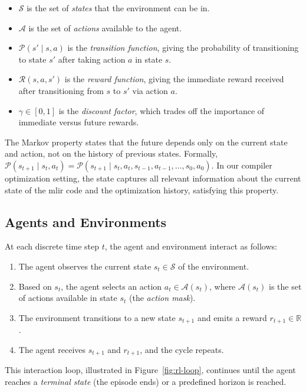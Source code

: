 \begin{itemize}
    \item $\mathcal{S}$ is the set of \textit{states} that the environment can be in.
    \item $\mathcal{A}$ is the set of \textit{actions} available to the agent.
    \item $\mathcal{P}(s' \mid s, a)$ is the \textit{transition function}, giving the probability of transitioning to state $s'$ after taking action $a$ in state $s$.
    \item $\mathcal{R}(s, a, s')$ is the \textit{reward function}, giving the immediate reward received after transitioning from $s$ to $s'$ via action $a$.
    \item $\gamma \in [0, 1]$ is the \textit{discount factor}, which trades off the importance of immediate versus future rewards.
\end{itemize}

The Markov property states that the future depends only on the current state and action, not on the history of previous states. Formally, $\mathcal{P}(s_{t+1} \mid s_t, a_t) = \mathcal{P}(s_{t+1} \mid s_t, a_t, s_{t-1}, a_{t-1}, \ldots, s_0, a_0)$. In our compiler optimization setting, the state captures all relevant information about the current state of the \gls{mlir} code and the optimization history, satisfying this property.

\subsection{Agents and Environments}

At each discrete time step $t$, the agent and environment interact as follows:

\begin{enumerate}
    \item The agent observes the current state $s_t \in \mathcal{S}$ of the environment.
    \item Based on $s_t$, the agent selects an action $a_t \in \mathcal{A}(s_t)$, where $\mathcal{A}(s_t)$ is the set of actions available in state $s_t$ (the \textit{action mask}).
    \item The environment transitions to a new state $s_{t+1}$ and emits a reward $r_{t+1} \in \mathbb{R}$.
    \item The agent receives $s_{t+1}$ and $r_{t+1}$, and the cycle repeats.
\end{enumerate}

This interaction loop, illustrated in Figure~\ref{fig:rl-loop}, continues until the agent reaches a \textit{terminal state} (the episode ends) or a predefined horizon is reached.

